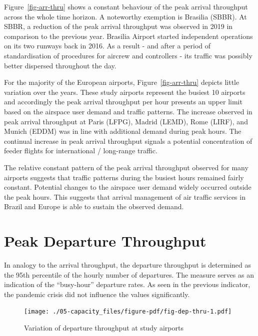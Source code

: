 \documentclass[
  a4paper,
  DIV=11,
  numbers=noendperiod]{scrreprt}
\begin{document}
Figure~\ref{fig-arr-thru} shows a constant behaviour of the peak arrival
throughput across the whole time horizon. A noteworthy exemption is
Brasilia (SBBR). At SBBR, a reduction of the peak arrival throughput was
observed in 2019 in comparison to the previous year. Brasilia Airport
started independent operations on its two runways back in 2016. As a
result - and after a period of standardisation of procedures for aircrew
and controllers - its traffic was possibly better dispersed throughout
the day.

For the majority of the European airports, Figure~\ref{fig-arr-thru}
depicts little variation over the years. These study airports represent
the busiest 10 airports and accordingly the peak arrival throughput per
hour presents an upper limit based on the airspace user demand and
traffic patterns. The increase observed in peak arrival throughput at
Paris (LFPG), Madrid (LEMD), Rome (LIRF), and Munich (EDDM) was in line
with additional demand during peak hours. The continual increase in peak
arrival throughput signals a potential concentration of feeder flights
for international / long-range traffic.

The relative constant pattern of the peak arrival throughput observed
for many airports suggests that traffic patterns during the busiest
hours remained fairly constant. Potential changes to the airspace user
demand widely occurred outside the peak hours. This suggests that
arrival management of air traffic services in Brazil and Europe is able
to sustain the observed demand.

\hypertarget{peak-departure-throughput}{%
\section{Peak Departure Throughput}\label{peak-departure-throughput}}

In analogy to the arrival throughput, the departure throughput is
determined as the 95th percentile of the hourly number of departures.
The measure serves as an indication of the ``busy-hour'' departure
rates. As seen in the previous indicator, the pandemic crisis did not
influence the values significantly.

\begin{figure}[h]

{\centering \texttt{[image: ./05-capacity\_files/figure-pdf/fig-dep-thru-1.pdf]}

}

\caption{\label{fig-dep-thru}Variation of departure throughput at study
airports}

\end{figure}
\end{document}
